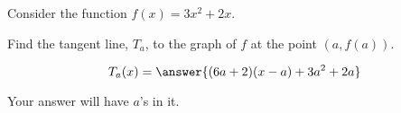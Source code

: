 \documentclass{ximera}
\author{Steven Gubkin}
\begin{document}
\begin{exercise}

	Consider the function $f(x) = 3x^2 + 2x$.

	Find the tangent line, $T_a$, to the graph of $f$ at the point $(a,f(a))$.

	\begin{prompt}
		\[ T_a(x) = \answer{(6a+2)(x-a)+3a^2+2a} \]
	\end{prompt}
	\begin{hint}
		Your answer will have $a$'s in it.
	\end{hint}

\end{exercise}
\end{document}
